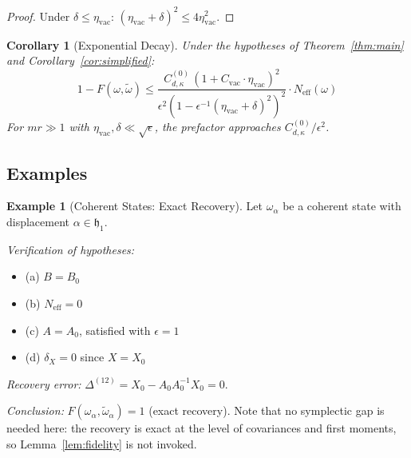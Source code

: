 \documentclass[11pt,a4paper]{article}
\theoremstyle{plain}
\newtheorem{corollary}[theorem]{Corollary}
\theoremstyle{definition}
\newtheorem{example}[theorem]{Example}
\theoremstyle{remark}
\newcommand{\hh}{\mathfrak{h}}
\newcommand{\etavac}{\eta_{\mathrm{vac}}}
\newcommand{\Cvac}{C_{\mathrm{vac}}}
\newcommand{\Neff}{N_{\mathrm{eff}}}
\newcommand{\Cd}{C^{(0)}_{d,\kappa}}
\begin{document}
\begin{proof}
Under $\delta \le \etavac$: $(\etavac + \delta)^2 \le 4\etavac^2$.
\end{proof}

\begin{corollary}[Exponential Decay]\label{cor:expdecay}
Under the hypotheses of Theorem~\ref{thm:main} and
Corollary~\ref{cor:simplified}:
\begin{equation}
1 - F(\omega, \tilde{\omega}) \le
\frac{\Cd\,(1 + \Cvac \cdot \etavac)^2}
{\epsilon^2\left(1 - \epsilon^{-1}(\etavac + \delta)^2\right)^2}
\cdot \Neff(\omega)
\end{equation}
For $mr \gg 1$ with $\etavac, \delta \ll \sqrt{\epsilon}$, the prefactor approaches
$\Cd/\epsilon^2$.
\end{corollary}

\subsection{Examples}

\begin{example}[Coherent States: Exact Recovery]\label{ex:coherent}
Let $\omega_\alpha$ be a coherent state with displacement $\alpha \in \hh_1$.

\emph{Verification of hypotheses:}
\begin{itemize}
\item (a) $B = B_0$ \checkmark
\item (b) $\Neff = 0$ \checkmark
\item (c) $A = A_0$, satisfied with $\epsilon = 1$ \checkmark
\item (d) $\delta_X = 0$ since $X = X_0$ \checkmark
\end{itemize}
\emph{Recovery error:} $\Delta^{(12)} = X_0 - A_0 A_0^{-1} X_0 = 0$.

\emph{Conclusion:} $F(\omega_\alpha, \tilde{\omega}_\alpha) = 1$ (exact recovery).
Note that no symplectic gap is needed here: the recovery is exact at the level of
covariances and first moments, so Lemma~\ref{lem:fidelity} is not invoked.
\end{example}
\end{document}
